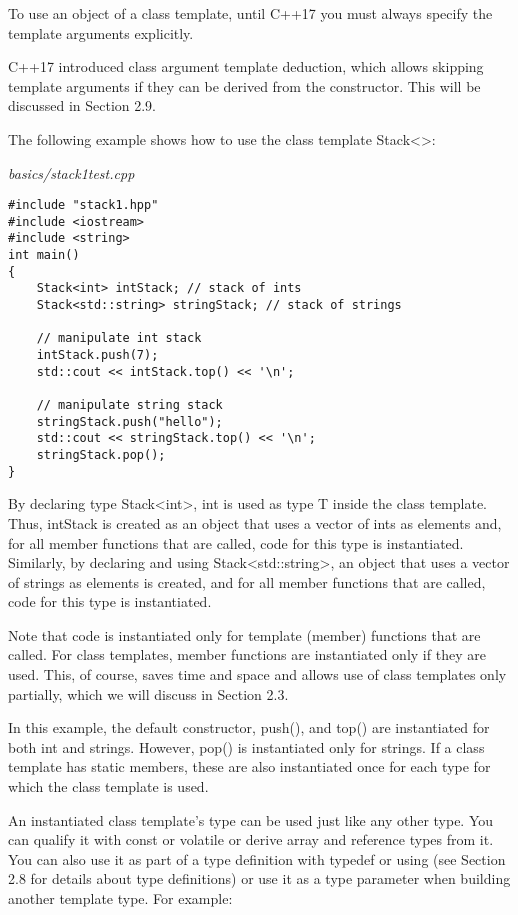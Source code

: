 To use an object of a class template, until C++17 you must always specify the template arguments explicitly.

\begin{tcolorbox}[colback=webgreen!5!white,colframe=webgreen!75!black]
\hspace*{0.75cm}C++17 introduced class argument template deduction, which allows skipping template arguments if they can
be derived from the constructor. This will be discussed in Section 2.9.
\end{tcolorbox}

The following example shows how to use the class template Stack<>:

\noindent
\textit{basics/stack1test.cpp}
\begin{lstlisting}[style=styleCXX]
#include "stack1.hpp"
#include <iostream>
#include <string>
int main()
{
	Stack<int> intStack; // stack of ints
	Stack<std::string> stringStack; // stack of strings
	
	// manipulate int stack
	intStack.push(7);
	std::cout << intStack.top() << '\n';
	
	// manipulate string stack
	stringStack.push("hello");
	std::cout << stringStack.top() << '\n';
	stringStack.pop();
}
\end{lstlisting}

By declaring type Stack<int>, int is used as type T inside the class template. Thus, intStack is created as an object that uses a vector of ints as elements and, for all member functions that are called, code for this type is instantiated. Similarly, by declaring and using Stack<std::string>, an object that uses a vector of strings as elements is created, and for all member functions that are called, code for this type is instantiated.

Note that code is instantiated only for template (member) functions that are called. For class templates, member functions are instantiated only if they are used. This, of course, saves time and space and allows use of class templates only partially, which we will discuss in Section 2.3.

In this example, the default constructor, push(), and top() are instantiated for both int and strings. However, pop() is instantiated only for strings. If a class template has static members, these are also instantiated once for each type for which the class template is used.

An instantiated class template’s type can be used just like any other type. You can qualify it with const or volatile or derive array and reference types from it. You can also use it as part of a type definition with typedef or using (see Section 2.8 for details about type definitions) or use it as a type parameter when building another template type. For example:

